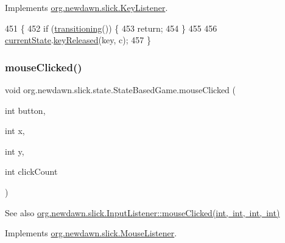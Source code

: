 Implements \mbox{\hyperlink{interfaceorg_1_1newdawn_1_1slick_1_1_key_listener_a474673b59bc77266bcef3c261c26ee2b}{org.\+newdawn.\+slick.\+Key\+Listener}}.


\begin{DoxyCode}
451                                              \{
452         \textcolor{keywordflow}{if} (\mbox{\hyperlink{classorg_1_1newdawn_1_1slick_1_1state_1_1_state_based_game_ae869c08778875776081935a090d4c92f}{transitioning}}()) \{
453             \textcolor{keywordflow}{return};
454         \}
455         
456         \mbox{\hyperlink{classorg_1_1newdawn_1_1slick_1_1state_1_1_state_based_game_a6a45e68094bb9b7ec30b8a8b7d415766}{currentState}}.\mbox{\hyperlink{interfaceorg_1_1newdawn_1_1slick_1_1_key_listener_a474673b59bc77266bcef3c261c26ee2b}{keyReleased}}(key, c);
457     \}
\end{DoxyCode}
\mbox{\label{classorg_1_1newdawn_1_1slick_1_1state_1_1_state_based_game_a79113474361d715e01ac3be4a2c100d0}} 
\subsubsection{\texorpdfstring{mouse\+Clicked()}{mouseClicked()}}
{\footnotesize\ttfamily void org.\+newdawn.\+slick.\+state.\+State\+Based\+Game.\+mouse\+Clicked (\begin{DoxyParamCaption}\item[{int}]{button,  }\item[{int}]{x,  }\item[{int}]{y,  }\item[{int}]{click\+Count }\end{DoxyParamCaption})\hspace{0.3cm}{\ttfamily [inline]}}

\begin{DoxySeeAlso}{See also}
\mbox{\hyperlink{interfaceorg_1_1newdawn_1_1slick_1_1_mouse_listener_a3e42b74c252ecdc7418b0ee8bcae5510}{org.\+newdawn.\+slick.\+Input\+Listener\+::mouse\+Clicked(int, int, int, int)}} 
\end{DoxySeeAlso}


Implements \mbox{\hyperlink{interfaceorg_1_1newdawn_1_1slick_1_1_mouse_listener_a3e42b74c252ecdc7418b0ee8bcae5510}{org.\+newdawn.\+slick.\+Mouse\+Listener}}.


